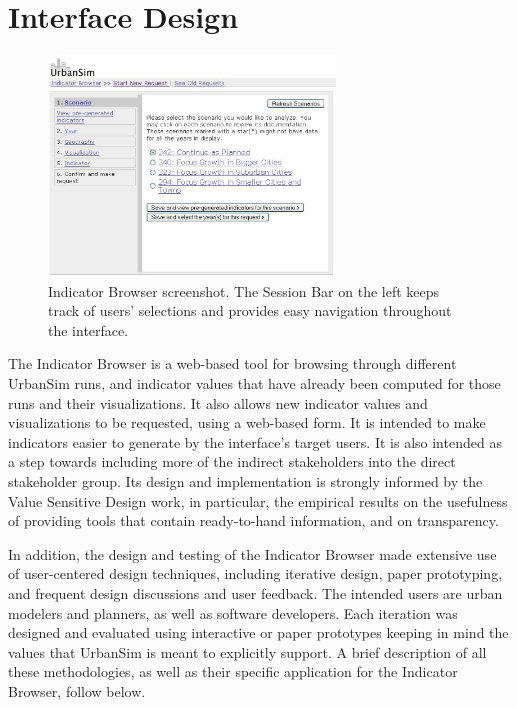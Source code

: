 
\section{Interface Design}
\label{sec:interface}

\begin{figure}
\centering
\includegraphics[width=3in]{figs/scenario_full}
\caption{\label{fig:scenario_full} Indicator Browser screenshot. The 
Session Bar on the left keeps track of users' selections and
provides easy navigation throughout the interface.}
\end{figure}

The Indicator Browser is a web-based tool for browsing through different
UrbanSim runs, and indicator values that have already been computed for those
runs and their visualizations.  It also allows new indicator values and
visualizations to be requested, using a web-based form. It is
intended to make indicators easier to generate by the interface's target users. 
It is also intended as a 
step towards including more of the indirect stakeholders into
the direct stakeholder group.  Its design and implementation is strongly
informed by the Value Sensitive Design work, in particular, the empirical
results on the usefulness of providing tools that contain ready-to-hand information, and on
transparency.

In addition, the design and testing of the Indicator Browser made extensive
use of user-centered design techniques, including iterative design, paper
prototyping, and frequent design discussions and user feedback.  
The intended users
are urban modelers and planners, as well as software developers.  Each
iteration was designed and evaluated using interactive or paper prototypes
keeping in mind the values that UrbanSim is meant to explicitly support.  A
brief description of all these methodologies, as well as their specific
application for the Indicator Browser, follow below.

